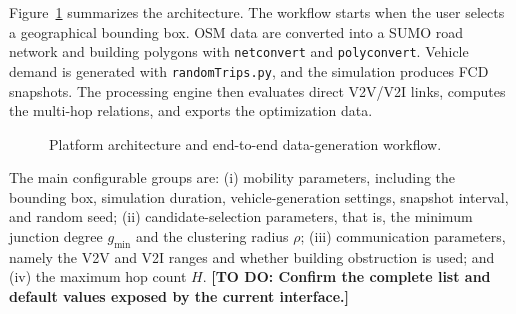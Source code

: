 \documentclass[engproc,proceedingpaper,submit,oneauthor]{Definitions/mdpi}
\newcommand{\todo}[1]{{\color{todored}\textbf{[TO DO: #1]}}}
\newcommand{\CVR}{\mathrm{CVR}}
\begin{document}
	Figure~\ref{fig:architecture} summarizes the architecture. The workflow starts when
	the user selects a geographical bounding box. OSM data are converted into a SUMO road
	network and building polygons with \texttt{netconvert} and \texttt{polyconvert}.
	Vehicle demand is generated with \texttt{randomTrips.py}, and the simulation produces
	FCD snapshots. The processing engine then evaluates direct V2V/V2I links, computes
	the multi-hop relations, and exports the optimization data.
	
	\begin{figure}[H]
		\centering
		\caption{Platform architecture and end-to-end data-generation workflow.}
		\label{fig:architecture}
	\end{figure}
	
	The main configurable groups are: (i) mobility parameters, including the bounding
	box, simulation duration, vehicle-generation settings, snapshot interval, and random
	seed; (ii) candidate-selection parameters, that is, the minimum junction degree
	$g_{\min}$ and the clustering radius $\rho$; (iii) communication parameters, namely
	the V2V and V2I ranges and whether building obstruction is used; and (iv) the maximum
	hop count $H$. \todo{Confirm the complete list and default values exposed by the
		current interface.}
	
\end{document}
